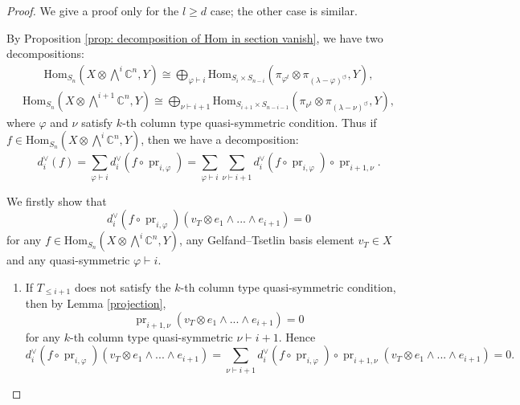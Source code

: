 \documentclass[11pt]{amsart}
\numberwithin{equation}{section}
\theoremstyle{definition}
\renewcommand{\phi}{\varphi}
\begin{document}
\begin{proof}
       We give a proof only for the $l\geq d$ case; the other case is similar.
       
       By Proposition \ref{prop: decomposition of Hom in section vanish}, we have two decompositions:
       \begin{eqnarray*}
           \mathrm{Hom}_{S_n}(X\otimes \bigwedge^i \mathbb C^n, Y) \cong \bigoplus_{\phi \vdash i} \mathrm{Hom}_{S_i \times S_{n-i}}(\pi_{\phi^t}\otimes \pi_{(\lambda-\phi)^{\circlearrowleft}}, Y),
       \end{eqnarray*}
       \begin{eqnarray*}
           \mathrm{Hom}_{S_n}(X\otimes \bigwedge^{i+1} \mathbb C^n, Y) \cong \bigoplus_{\nu \vdash i+1} \mathrm{Hom}_{S_{i+1} \times S_{n-i-1}}(\pi_{\nu^t}\otimes \pi_{(\lambda-\nu)^{\circlearrowleft}}, Y),
       \end{eqnarray*}
       where $\phi$ and $\nu$ satisfy $k$-th column type quasi-symmetric condition. Thus if $f\in \mathrm{Hom}_{S_n}(X\otimes \bigwedge^{i} \mathbb C^n, Y)$, then we have a decomposition:
       \begin{equation*}
           d_{i}^{\vee}(f)=\sum_{\phi\vdash i}d_{i}^{\vee}(f\circ\operatorname{pr}_{i,\phi})=\sum_{\phi\vdash i}\sum_{\nu\vdash i+1}d_{i}^{\vee}(f\circ\operatorname{pr}_{i,\phi})\circ\operatorname{pr}_{i+1,\nu}.
       \end{equation*}
       
       We firstly show that 
       \[
       d_{i}^{\vee}(f\circ\operatorname{pr}_{i,\phi})(v_T\otimes e_{1}\wedge...\wedge e_{i+1})=0
       \]
       for any 
       $f\in\mathrm{Hom}_{S_n}(X\otimes \bigwedge^i \mathbb C^n, Y)$, any Gelfand–Tsetlin basis element $v_{T}\in X$ and any quasi-symmetric $\phi\vdash i$.
       
       
       \begin{enumerate}
           \item 
           If $T_{\leq i+1}$ does not satisfy the $k$-th column type quasi-symmetric condition, then by Lemma \ref{projection}, 
            \begin{equation*}
           \operatorname{pr}_{i+1,\nu}(v_{T}\otimes e_{1}\wedge...\wedge e_{i+1})=0
            \end{equation*} 
            for any $k$-th column type quasi-symmetric $\nu\vdash i+1$. Hence 
           \begin{equation*}
         d_{i}^{\vee}(f\circ\operatorname{pr}_{i,\phi})(v_T\otimes e_{1}\wedge...\wedge e_{i+1})=\sum_{\nu\vdash i+1} d_{i}^{\vee}(f\circ\operatorname{pr}_{i,\phi})\circ\operatorname{pr}_{i+1,\nu}(v_T\otimes e_{1}\wedge...\wedge e_{i+1})=0.
          \end{equation*}


\end{enumerate}
\end{proof}
\end{document}

